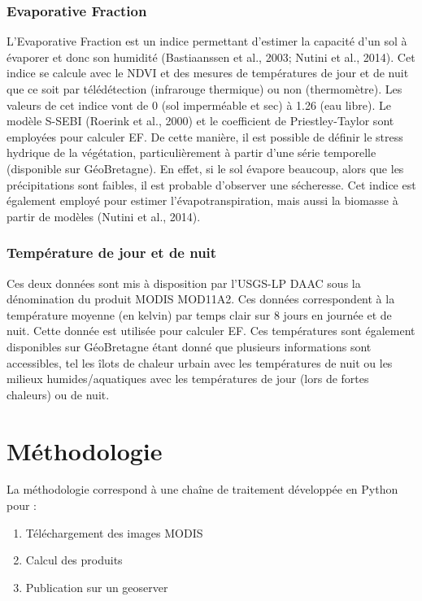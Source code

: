 \documentclass[10pt,a4paper]{article}
\begin{document}
\subsubsection{Evaporative Fraction}

L'Evaporative Fraction est un indice permettant d'estimer la capacité d'un sol à évaporer et donc son humidité (Bastiaanssen et al., 2003; Nutini et al., 2014). Cet indice se calcule avec le NDVI et des mesures de températures de jour et de nuit que ce soit par télédétection (infrarouge thermique) ou non (thermomètre). Les valeurs de cet indice vont de 0 (sol imperméable et sec) à 1.26 (eau libre). Le modèle S-SEBI (Roerink et al., 2000) et le coefficient de Priestley-Taylor sont employées pour calculer EF. \smallbreak
De cette manière, il est possible de définir le stress hydrique de la végétation, particulièrement à partir d'une série temporelle (disponible sur GéoBretagne). En effet, si le sol évapore beaucoup, alors que les précipitations sont faibles, il est probable d'observer une sécheresse. Cet indice est également employé pour estimer l'évapotranspiration, mais aussi la biomasse à partir de modèles (Nutini et al., 2014).

\subsubsection{Température de jour et de nuit}

Ces deux données sont mis à disposition par l'USGS-LP DAAC sous la dénomination du produit MODIS MOD11A2. Ces données correspondent à la température moyenne (en kelvin) par temps clair sur 8 jours en journée et de nuit. Cette donnée est utilisée pour calculer EF. Ces températures sont également disponibles sur GéoBretagne étant donné que plusieurs informations sont accessibles, tel les îlots de chaleur urbain avec les températures de nuit ou les milieux humides/aquatiques avec les températures de jour (lors de fortes chaleurs) ou de nuit.

\section{Méthodologie}

La méthodologie correspond à une chaîne de traitement développée en Python pour :
\begin{enumerate}
\item Téléchargement des images MODIS
\item Calcul des produits
\item Publication sur un geoserver
\end{enumerate}
\end{document}
